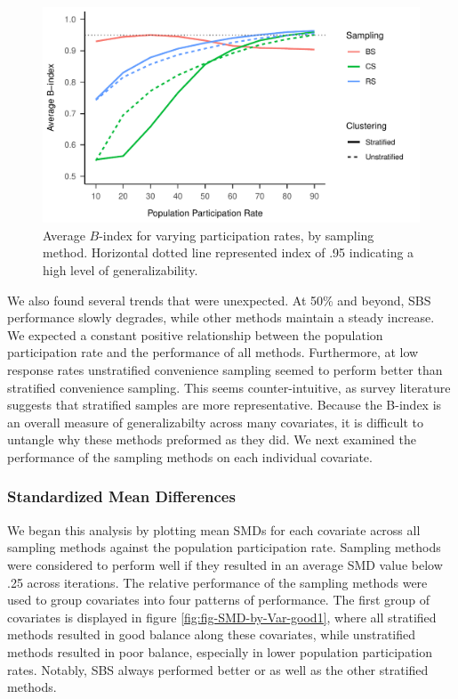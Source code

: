 \documentclass[man,floatsintext]{apa6}
\begin{document}
\begin{figure}
\centering
\includegraphics{GenSamp-Paper_files/figure-latex/fig-avg-Bindex-1.pdf}
\caption{\label{fig:fig-avg-Bindex}Average \(B\)-index for varying participation rates, by sampling method. Horizontal dotted line represented index of .95 indicating a high level of generalizability.}
\end{figure}

We also found several trends that were unexpected. At 50\% and beyond, SBS performance slowly degrades, while other methods maintain a steady increase. We expected a constant positive relationship between the population participation rate and the performance of all methods. Furthermore, at low response rates unstratified convenience sampling seemed to perform better than stratified convenience sampling. This seems counter-intuitive, as survey literature suggests that stratified samples are more representative. Because the B-index is an overall measure of generalizabilty across many covariates, it is difficult to untangle why these methods preformed as they did. We next examined the performance of the sampling methods on each individual covariate.

\hypertarget{standardized-mean-differences}{%
\subsubsection{Standardized Mean Differences}\label{standardized-mean-differences}}

We began this analysis by plotting mean SMDs for each covariate across all sampling methods against the population participation rate. Sampling methods were considered to perform well if they resulted in an average SMD value below .25 across iterations. The relative performance of the sampling methods were used to group covariates into four patterns of performance. The first group of covariates is displayed in figure \ref{fig:fig-SMD-by-Var-good1}, where all stratified methods resulted in good balance along these covariates, while unstratified methods resulted in poor balance, especially in lower population participation rates. Notably, SBS always performed better or as well as the other stratified methods.
\end{document}

